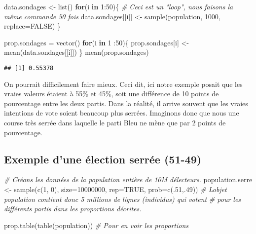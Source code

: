 \documentclass[
]{book}
\newenvironment{Shaded}{\begin{snugshade}}{\end{snugshade}}
\newcommand{\AttributeTok}[1]{\textcolor[rgb]{0.77,0.63,0.00}{#1}}
\newcommand{\CommentTok}[1]{\textcolor[rgb]{0.56,0.35,0.01}{\textit{#1}}}
\newcommand{\ConstantTok}[1]{\textcolor[rgb]{0.00,0.00,0.00}{#1}}
\newcommand{\ControlFlowTok}[1]{\textcolor[rgb]{0.13,0.29,0.53}{\textbf{#1}}}
\newcommand{\DecValTok}[1]{\textcolor[rgb]{0.00,0.00,0.81}{#1}}
\newcommand{\FunctionTok}[1]{\textcolor[rgb]{0.00,0.00,0.00}{#1}}
\newcommand{\NormalTok}[1]{#1}
\newcommand{\OtherTok}[1]{\textcolor[rgb]{0.56,0.35,0.01}{#1}}
\newcommand{\SpecialCharTok}[1]{\textcolor[rgb]{0.00,0.00,0.00}{#1}}
\begin{document}
\begin{Shaded}
\begin{Highlighting}[]
\NormalTok{data.sondages }\OtherTok{\textless{}{-}} \FunctionTok{list}\NormalTok{()}
\ControlFlowTok{for}\NormalTok{(i }\ControlFlowTok{in} \DecValTok{1}\SpecialCharTok{:}\DecValTok{50}\NormalTok{)\{ }\CommentTok{\# Ceci est un "loop", nous faisons la même commande 50 fois}
\NormalTok{    data.sondages[[i]] }\OtherTok{\textless{}{-}} \FunctionTok{sample}\NormalTok{(population, }\DecValTok{1000}\NormalTok{, }\AttributeTok{replace=}\ConstantTok{FALSE}\NormalTok{)}
\NormalTok{\}}

\NormalTok{prop.sondages }\OtherTok{=} \FunctionTok{vector}\NormalTok{()}
\ControlFlowTok{for}\NormalTok{(i }\ControlFlowTok{in} \DecValTok{1} \SpecialCharTok{:}\DecValTok{50}\NormalTok{)\{}
\NormalTok{    prop.sondages[i] }\OtherTok{\textless{}{-}} \FunctionTok{mean}\NormalTok{(data.sondages[[i]])}
\NormalTok{\}}
\FunctionTok{mean}\NormalTok{(prop.sondages)}
\end{Highlighting}
\end{Shaded}

\begin{verbatim}
## [1] 0.55378
\end{verbatim}

On pourrait difficilement faire mieux. Ceci dit, ici notre exemple posait que les vraies valeurs étaient à 55\% et 45\%, soit une différence de 10 points de pourcentage entre les deux partis. Dans la réalité, il arrive souvent que les vraies intentions de vote soient beaucoup plus serrées. Imaginons donc que nous une course très serrée dans laquelle le parti Bleu ne mène que par 2 points de pourcentage.

\hypertarget{exemple-dune-uxe9lection-serruxe9e-51-49}{%
\subsection{Exemple d'une élection serrée (51-49)}\label{exemple-dune-uxe9lection-serruxe9e-51-49}}

\begin{Shaded}
\begin{Highlighting}[]
\CommentTok{\# Créons les données de la population entière de 10M d\textquotesingle{}électeurs.}
\NormalTok{population.serre }\OtherTok{\textless{}{-}} \FunctionTok{sample}\NormalTok{(}\FunctionTok{c}\NormalTok{(}\DecValTok{1}\NormalTok{, }\DecValTok{0}\NormalTok{), }\AttributeTok{size=}\DecValTok{10000000}\NormalTok{, }\AttributeTok{rep=}\ConstantTok{TRUE}\NormalTok{, }\AttributeTok{prob=}\FunctionTok{c}\NormalTok{(.}\DecValTok{51}\NormalTok{,.}\DecValTok{49}\NormalTok{))}
\CommentTok{\# L\textquotesingle{}objet population contient donc 5 millions de lignes (individus) qui votent }
\CommentTok{\# pour les différents partis dans les proportions décrites.}

\FunctionTok{prop.table}\NormalTok{(}\FunctionTok{table}\NormalTok{(population)) }\CommentTok{\# Pour en voir les proportions}
\end{Highlighting}
\end{Shaded}
\end{document}
